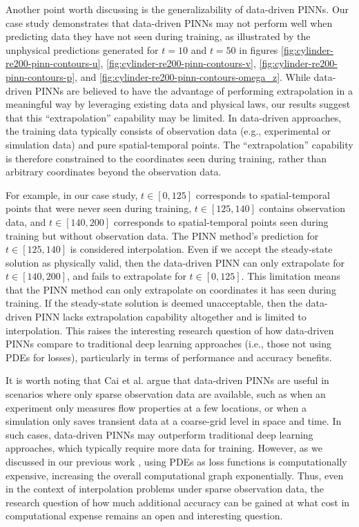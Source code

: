 Another point worth discussing is the generalizability of data-driven PINNs.
Our case study demonstrates that data-driven PINNs may not perform well when predicting data they have not seen during training, as illustrated by the unphysical predictions generated for $t = 10$ and $t = 50$ in figures \ref{fig:cylinder-re200-pinn-contours-u}, \ref{fig:cylinder-re200-pinn-contours-v}, \ref{fig:cylinder-re200-pinn-contours-p}, and \ref{fig:cylinder-re200-pinn-contours-omega_z}.
While data-driven PINNs are believed to have the advantage of performing extrapolation in a meaningful way by leveraging existing data and physical laws, our results suggest that this ``extrapolation'' capability may be limited.
In data-driven approaches, the training data typically consists of observation data (e.g., experimental or simulation data) and pure spatial-temporal points.
The ``extrapolation'' capability is therefore constrained to the coordinates seen during training, rather than arbitrary coordinates beyond the observation data.

For example, in our case study, $t \in [0, 125]$ corresponds to spatial-temporal points that were never seen during training, $t \in [125, 140]$ contains observation data, and $t \in [140, 200]$ corresponds to spatial-temporal points seen during training but without observation data.
The PINN method's prediction for $t \in [125, 140]$ is considered interpolation.
Even if we accept the steady-state solution as physically valid, then the data-driven PINN can only extrapolate for $t \in [140, 200]$, and fails to extrapolate for $t \in [0, 125]$.
This limitation means that the PINN method can only extrapolate on coordinates it has seen during training.
If the steady-state solution is deemed unacceptable, then the data-driven PINN lacks extrapolation capability altogether and is limited to interpolation.
This raises the interesting research question of how data-driven PINNs compare to traditional deep learning approaches (i.e., those not using PDEs for losses), particularly in terms of performance and accuracy benefits.

It is worth noting that Cai et al. \cite{cai_physics-informed_2021} argue that data-driven PINNs are useful in scenarios where only sparse observation data are available, such as when an experiment only measures flow properties at a few locations, or when a simulation only saves transient data at a coarse-grid level in space and time.
In such cases, data-driven PINNs may outperform traditional deep learning approaches, which typically require more data for training.
However, as we discussed in our previous work \cite{chuang_experience_2022}, using PDEs as loss functions is computationally expensive, increasing the overall computational graph exponentially.
Thus, even in the context of interpolation problems under sparse observation data, the research question of how much additional accuracy can be gained at what cost in computational expense remains an open and interesting question.

